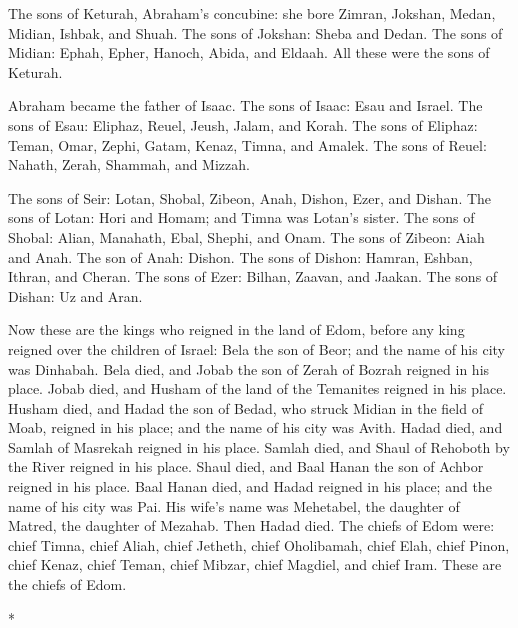 \begin{paracol}{2}
\begin{otherlanguage}{english}
 The sons of Keturah, Abraham's concubine: she bore
Zimran, Jokshan, Medan, Midian, Ishbak, and Shuah. The sons of Jokshan:
Sheba and Dedan.  The sons of Midian: Ephah, Epher,
Hanoch, Abida, and Eldaah. All these were the sons of Keturah.

 Abraham became the father of Isaac. The sons of Isaac:
Esau and Israel.  The sons of Esau: Eliphaz, Reuel,
Jeush, Jalam, and Korah.  The sons of Eliphaz: Teman,
Omar, Zephi, Gatam, Kenaz, Timna, and Amalek.  The sons
of Reuel: Nahath, Zerah, Shammah, and Mizzah.

 The sons of Seir: Lotan, Shobal, Zibeon, Anah, Dishon,
Ezer, and Dishan.  The sons of Lotan: Hori and Homam; and
Timna was Lotan's sister.  The sons of Shobal: Alian,
Manahath, Ebal, Shephi, and Onam. The sons of Zibeon: Aiah and Anah.
 The son of Anah: Dishon. The sons of Dishon: Hamran,
Eshban, Ithran, and Cheran.  The sons of Ezer: Bilhan,
Zaavan, and Jaakan. The sons of Dishan: Uz and Aran.

 Now these are the kings who reigned in the land of Edom,
before any king reigned over the children of Israel: Bela the son of
Beor; and the name of his city was Dinhabah.  Bela died,
and Jobab the son of Zerah of Bozrah reigned in his place.
 Jobab died, and Husham of the land of the Temanites
reigned in his place.  Husham died, and Hadad the son of
Bedad, who struck Midian in the field of Moab, reigned in his place; and
the name of his city was Avith.  Hadad died, and Samlah
of Masrekah reigned in his place.  Samlah died, and Shaul
of Rehoboth by the River reigned in his place.  Shaul
died, and Baal Hanan the son of Achbor reigned in his place.
 Baal Hanan died, and Hadad reigned in his place; and the
name of his city was Pai. His wife's name was Mehetabel, the daughter of
Matred, the daughter of Mezahab.  Then Hadad died. The
chiefs of Edom were: chief Timna, chief Aliah, chief Jetheth,
 chief Oholibamah, chief Elah, chief Pinon,
 chief Kenaz, chief Teman, chief Mibzar, 
chief Magdiel, and chief Iram. These are the chiefs of Edom.

\end{otherlanguage}

\switchcolumn[0]*


\end{paracol}
